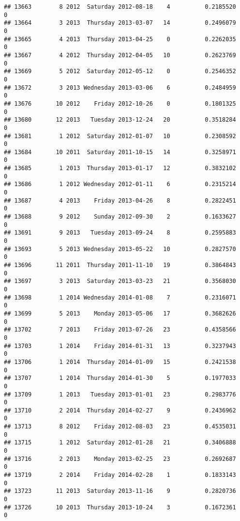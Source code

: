 \documentclass[
]{article}
\begin{document}
\begin{verbatim}
## 13663        8 2012  Saturday 2012-08-18    4          0.2185520             0
## 13664        3 2013  Thursday 2013-03-07   14          0.2496079             0
## 13665        4 2013  Thursday 2013-04-25    0          0.2262035             0
## 13667        4 2012  Thursday 2012-04-05   10          0.2623769             0
## 13669        5 2012  Saturday 2012-05-12    0          0.2546352             0
## 13672        3 2013 Wednesday 2013-03-06    6          0.2484959             0
## 13676       10 2012    Friday 2012-10-26    0          0.1801325             0
## 13680       12 2013   Tuesday 2013-12-24   20          0.3518284             0
## 13681        1 2012  Saturday 2012-01-07   10          0.2308592             0
## 13684       10 2011  Saturday 2011-10-15   14          0.3258971             0
## 13685        1 2013  Thursday 2013-01-17   12          0.3832102             0
## 13686        1 2012 Wednesday 2012-01-11    6          0.2315214             0
## 13687        4 2013    Friday 2013-04-26    8          0.2822451             0
## 13688        9 2012    Sunday 2012-09-30    2          0.1633627             0
## 13691        9 2013   Tuesday 2013-09-24    8          0.2595883             0
## 13693        5 2013 Wednesday 2013-05-22   10          0.2827570             0
## 13696       11 2011  Thursday 2011-11-10   19          0.3864843             0
## 13697        3 2013  Saturday 2013-03-23   21          0.3568030             0
## 13698        1 2014 Wednesday 2014-01-08    7          0.2316071             0
## 13699        5 2013    Monday 2013-05-06   17          0.3682626             0
## 13702        7 2013    Friday 2013-07-26   23          0.4358566             0
## 13703        1 2014    Friday 2014-01-31   13          0.3237943             0
## 13706        1 2014  Thursday 2014-01-09   15          0.2421538             0
## 13707        1 2014  Thursday 2014-01-30    5          0.1977033             0
## 13709        1 2013   Tuesday 2013-01-01   23          0.2983776             0
## 13710        2 2014  Thursday 2014-02-27    9          0.2436962             0
## 13713        8 2012    Friday 2012-08-03   23          0.4535031             0
## 13715        1 2012  Saturday 2012-01-28   21          0.3406888             0
## 13716        2 2013    Monday 2013-02-25   23          0.2692687             0
## 13719        2 2014    Friday 2014-02-28    1          0.1833143             0
## 13723       11 2013  Saturday 2013-11-16    9          0.2820736             0
## 13726       10 2013  Thursday 2013-10-24    3          0.1672361             0

\end{verbatim}
\end{document}
